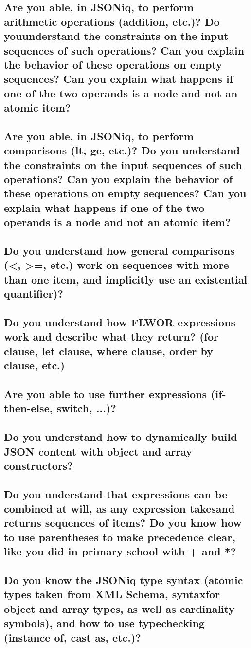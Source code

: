 \documentclass{article}
\begin{document}
\subsection{Are you able, in JSONiq, to perform arithmetic operations (addition, etc.)? Do youunderstand the constraints on the input sequences of such operations? Can you explain the behavior of these operations on empty sequences? Can you explain what happens if one of the two operands is a node and not an atomic item?}
\subsection{Are you able, in JSONiq, to perform comparisons (lt, ge, etc.)? Do you understand the constraints on the input sequences of such operations? Can you explain the behavior of these operations on empty sequences? Can you explain what happens if one of the two operands is a node and not an atomic item?}
\subsection{Do you understand how general comparisons (<, >=, etc.) work on sequences with more than one item, and implicitly use an existential quantifier)?}
\subsection{Do you understand how FLWOR expressions work and describe what they return? (for clause, let clause, where clause, order by clause, etc.)}
\subsection{Are you able to use further expressions (if-then-else, switch, ...)?}
\subsection{Do you understand how to dynamically build JSON content with object and array constructors?}
\subsection{Do you understand that expressions can be combined at will, as any expression takesand returns sequences of items? Do you know how to use parentheses to make precedence clear, like you did in primary school with + and *?}
\subsection{Do you know the JSONiq type syntax (atomic types taken from XML Schema, syntaxfor object and array types, as well as cardinality symbols), and how to use typechecking (instance of, cast as, etc.)?}
\end{document}
